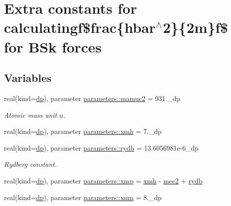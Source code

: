 \hypertarget{group__HBAR2__2M}{}\section{Extra constants for calculatingf\$frac\{hbar$^\wedge$2\}\{2m\}f\$ for B\+Sk forces}
\label{group__HBAR2__2M}
\subsection*{Variables}
\begin{DoxyCompactItemize}
\item 
real(kind=\mbox{\hyperlink{namespaceparameters_a52f8c6351fd79345d8811e065bcbbb37}{dp}}), parameter \mbox{\hyperlink{group__HBAR2__2M_gaa00326a999bcae07e22d89387404ac19}{parameters\+::mamuc2}} = 931.\+\_\+dp
\begin{DoxyCompactList}\small\item\em Atomic mass unit $u$. \end{DoxyCompactList}\item 
real(kind=\mbox{\hyperlink{namespaceparameters_a52f8c6351fd79345d8811e065bcbbb37}{dp}}), parameter \mbox{\hyperlink{group__HBAR2__2M_gaad7518fe64b61c89a5fdca4244b22af1}{parameters\+::xmh}} = 7.\+\_\+dp
\item 
real(kind=\mbox{\hyperlink{namespaceparameters_a52f8c6351fd79345d8811e065bcbbb37}{dp}}), parameter \mbox{\hyperlink{group__HBAR2__2M_ga1ee1de4838adf9dd601aa5c6d518709c}{parameters\+::rydb}} = 13.\+6056981e-\/6\+\_\+dp
\begin{DoxyCompactList}\small\item\em Rydberg constant. \end{DoxyCompactList}\item 
real(kind=\mbox{\hyperlink{namespaceparameters_a52f8c6351fd79345d8811e065bcbbb37}{dp}}), parameter \mbox{\hyperlink{group__HBAR2__2M_gaca637757baec6d59dc2b73dcf21b6b3d}{parameters\+::xmp}} = \mbox{\hyperlink{group__HBAR2__2M_gaad7518fe64b61c89a5fdca4244b22af1}{xmh}} -\/ \mbox{\hyperlink{group__CONSTANTS_ga8b91e60e1e7c4b066cc282415c740bc9}{mec2}} + \mbox{\hyperlink{group__HBAR2__2M_ga1ee1de4838adf9dd601aa5c6d518709c}{rydb}}
\item 
real(kind=\mbox{\hyperlink{namespaceparameters_a52f8c6351fd79345d8811e065bcbbb37}{dp}}), parameter \mbox{\hyperlink{group__HBAR2__2M_ga54928a3b468a11418226e44d5f2337ce}{parameters\+::xmn}} = 8.\+\_\+dp
\end{DoxyCompactItemize}


